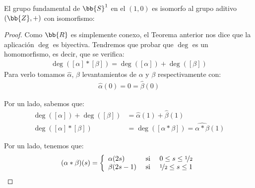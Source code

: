\begin{teo}\label{teo:grupo_fundamental_circunferencia}
    El grupo fundamental de $\bb{S}^1$ en el $(1,0)$ es isomorfo al grupo aditivo $(\bb{Z}, +)$ con isomorfismo:
    \begin{proof}
        Como $\bb{R}$ es simplemente conexo, el Teorema anterior nos dice que la aplicación $\deg$ es biyectiva. Tendremos que probar que $\deg$ es un homomorfismo, es decir, que se verifica:
        \begin{gather*}
            \deg([\alpha] \ast [\beta]) = \deg([\alpha]) + \deg([\beta])
        \end{gather*}
        Para verlo tomamos $\hat{\alpha}$, $\hat{\beta}$ levantamientos de $\alpha$ y $\beta$ respectivamente con: 
        \begin{gather*}
            \hat{\alpha}(0) = 0 = \hat{\beta}(0)
        \end{gather*}

        Por un lado, sabemos que:
        \begin{align*}
            \deg([\alpha])+\deg([\beta]) &= \hat{\alpha}(1) + \hat{\beta}(1)\\
            \deg([\alpha] \ast [\beta]) &= \deg([\alpha \ast \beta]) = \widehat{\alpha \ast \beta}(1)
        \end{align*}

        Por un lado, tenemos que:
        \begin{gather*}
            (\alpha\ast \beta)(s) = \left\{
                \begin{array}{l c c}
                    \alpha(2s) & \text{ si } & 0 \leq s \leq \nicefrac{1}{2}\\
                    \beta(2s-1) & \text{ si } &\nicefrac{1}{2} \leq s \leq 1
                \end{array}
            \right.
        \end{gather*}


\end{proof}
\end{teo}
